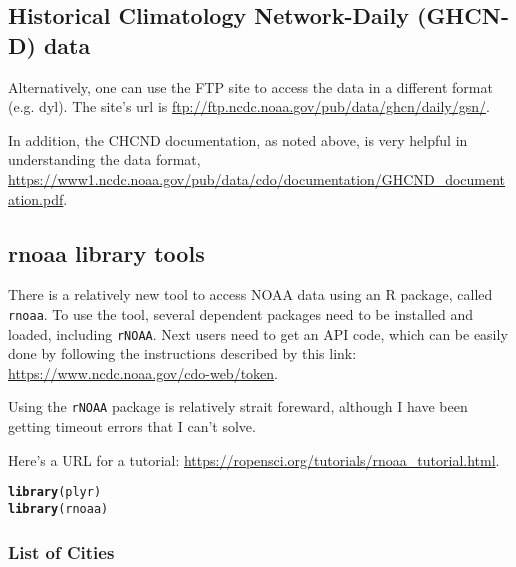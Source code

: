 \documentclass{article}\usepackage[]{graphicx}\usepackage[]{color}
\makeatletter
\newcommand{\hlstd}[1]{\textcolor[rgb]{0.345,0.345,0.345}{#1}}%
\newcommand{\hlkwd}[1]{\textcolor[rgb]{0.737,0.353,0.396}{\textbf{#1}}}%
\newenvironment{kframe}{%
 \def\at@end@of@kframe{}%
 \ifinner\ifhmode%
  \def\at@end@of@kframe{\end{minipage}}%
  \begin{minipage}{\columnwidth}%
 \fi\fi%
 \def\FrameCommand##1{\hskip\@totalleftmargin \hskip-\fboxsep
 \colorbox{shadecolor}{##1}\hskip-\fboxsep
     \hskip-\linewidth \hskip-\@totalleftmargin \hskip\columnwidth}%
 \MakeFramed {\advance\hsize-\width
   \@totalleftmargin\z@ \linewidth\hsize
   \@setminipage}}%
 {\par\unskip\endMakeFramed%
 \at@end@of@kframe}
\newenvironment{knitrout}{}{} %
\makeatother
\begin{document}
\subsection{Historical Climatology Network-Daily (GHCN‐D) data}

Alternatively, one can use the FTP site to access the data in a different format (e.g. dyl). The site's url is \url{ftp://ftp.ncdc.noaa.gov/pub/data/ghcn/daily/gsn/}. 

In addition, the CHCND documentation, as noted above, is very helpful in understanding the data format, \url{https://www1.ncdc.noaa.gov/pub/data/cdo/documentation/GHCND_documentation.pdf}.

\subsection{rnoaa library tools}

There is a relatively new tool to access NOAA data using an R package, called \texttt{rnoaa}. To use the tool, several dependent packages need to be installed and loaded, including \texttt{rNOAA}. Next users need to get an API code, which can be easily done by following the instructions described by this link: \url{https://www.ncdc.noaa.gov/cdo-web/token}.

Using the \texttt{rNOAA} package is relatively strait foreward, although I have been getting timeout errors that I can't solve. 

Here's a URL for a tutorial: \url{https://ropensci.org/tutorials/rnoaa_tutorial.html}.

\begin{knitrout}
\color{fgcolor}\begin{kframe}
\begin{alltt}
\hlkwd{library}\hlstd{(plyr)}
\hlkwd{library}\hlstd{(rnoaa)}
\end{alltt}


{\ttfamily\noindent\bfseries\color{errorcolor}{\#\# Error in library(rnoaa): there is no package called 'rnoaa'}}\end{kframe}
\end{knitrout}



\subsubsection{List of Cities}
\end{document}
